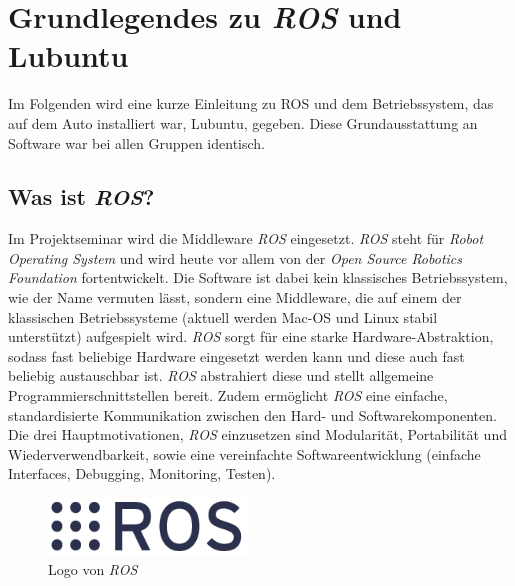 \section{Grundlegendes zu \textit{ROS} und Lubuntu}
\label{sec:grundlegendesROS-OS}   
Im Folgenden wird eine kurze Einleitung zu ROS und dem Betriebssystem, das auf dem Auto installiert war, Lubuntu, gegeben. Diese Grundausstattung an Software war bei allen Gruppen identisch.
\subsection{Was ist \textit{ROS}?}
Im Projektseminar wird die Middleware \textit{ROS} eingesetzt. \textit{ROS} steht für \textit{Robot Operating System} und wird heute vor allem von der \textit{Open Source Robotics Foundation} fortentwickelt. Die Software ist dabei kein klassisches Betriebssystem, wie der Name vermuten lässt, sondern eine Middleware, die auf einem der klassischen Betriebssysteme (aktuell werden Mac-OS und Linux stabil unterstützt) aufgespielt wird. \textit{ROS} sorgt für eine starke Hardware-Abstraktion, sodass fast beliebige Hardware eingesetzt werden kann und diese auch fast beliebig austauschbar ist. \textit{ROS} abstrahiert diese und stellt allgemeine Programmierschnittstellen bereit. Zudem ermöglicht \textit{ROS} eine einfache, standardisierte Kommunikation zwischen den Hard- und Softwarekomponenten.
Die drei Hauptmotivationen, \textit{ROS} einzusetzen sind Modularität, Portabilität und Wiederverwendbarkeit, sowie eine vereinfachte Softwareentwicklung (einfache Interfaces, Debugging, Monitoring, Testen).

\begin{figure}[htbp] 
	\centering
	\includegraphics[width=150pt]{images/rosorg-logo1.png}
	\caption{Logo von \textit{ROS}}
	\label{fig:LogoROS}
\end{figure}

